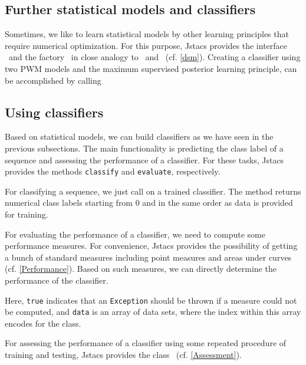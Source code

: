 \subsection{Further statistical models and classifiers}

Sometimes, we like to learn statistical models by other learning principles that require numerical optimization. For this purpose, Jstacs provides the interface \DiffSM~and the factory \DiffSMFactory~in close analogy to \TrainSM~and \TrainSMFactory~(cf. \ref{dsm}). Creating a classifier using two PWM models and the maximum supervised posterior learning principle, can be accomplished by calling
\renewcommand{\codefile}{recipes/CreateMSPClassifier.java}
\setcounter{off}{49}
\addtocounter{off}{2}
\addtocounter{off}{2}

\subsection{Using classifiers}

\renewcommand{\codefile}{recipes/TrainClassifier.java}
Based on statistical models, we can build classifiers as we have seen in the previous subsections. The main functionality is predicting the class label of a sequence and assessing the performance of a classifier. For these tasks, Jstacs provides the methods \lstinline+classify+ and \lstinline+evaluate+, respectively.

For classifying a sequence, we just call
\setcounter{off}{58}
on a trained classifier. The method returns numerical class labels starting from $0$ and in the same order as data is provided for training.

For evaluating the performance of a classifier, we need to compute some performance measures. For convenience, Jstacs provides the possibility of getting a bunch of standard measures including point measures and areas under curves (cf. \ref{Performance}). Based on such measures, we can directly determine the performance of the classifier.
\addtocounter{off}{5}
Here, \lstinline+true+ indicates that an \lstinline+Exception+ should be thrown if a measure could not be computed, and \lstinline+data+ is an array of data sets, where the index within this array encodes for the class.

For assessing the performance of a classifier using some repeated procedure of training and testing, Jstacs provides the class \ClassifierAssessment~(cf. \ref{Assessment}).

\renewcommand{\codefile}{\defaultcodefile}
\setcounter{off}{1}